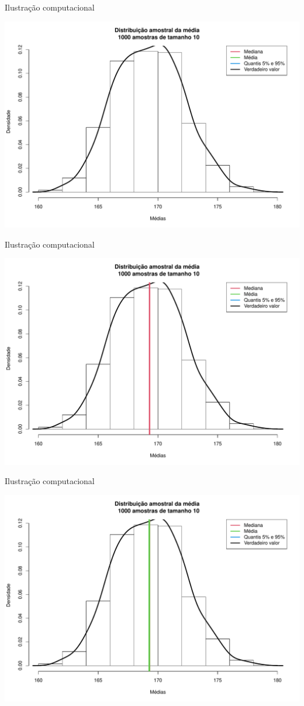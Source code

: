 \documentclass[
  ignorenonframetext,
  serif,
  professionalfont,
  usenames,
  dvipsnames,
  aspectratio = 169]{beamer}
\begin{document}
\begin{frame}{Ilustração computacional}
\protect\hypertarget{ilustrauxe7uxe3o-computacional-2}{}
\begin{center}\includegraphics[width=0.7\linewidth]{600-intro-inferencia_files/figure-beamer/unnamed-chunk-1-1} \end{center}
\end{frame}

\begin{frame}{Ilustração computacional}
\protect\hypertarget{ilustrauxe7uxe3o-computacional-3}{}
\begin{center}\includegraphics[width=0.7\linewidth]{600-intro-inferencia_files/figure-beamer/unnamed-chunk-2-1} \end{center}
\end{frame}

\begin{frame}{Ilustração computacional}
\protect\hypertarget{ilustrauxe7uxe3o-computacional-4}{}
\begin{center}\includegraphics[width=0.7\linewidth]{600-intro-inferencia_files/figure-beamer/unnamed-chunk-3-1} \end{center}
\end{frame}
\end{document}
